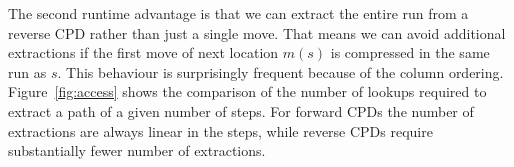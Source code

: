 The second runtime advantage is that we can extract the entire run 
from a reverse CPD rather than just a single move.
That means we can avoid additional extractions if the first move of next location $m(s)$ 
is compressed in the same run as $s$.
This behaviour is surprisingly frequent because of the column ordering. 
Figure~\ref{fig:access} shows the comparison of the number of lookups required to 
extract a path of a given number of steps.
For forward CPDs the number of extractions are always linear in the steps, 
while reverse CPDs require substantially fewer number of extractions.

